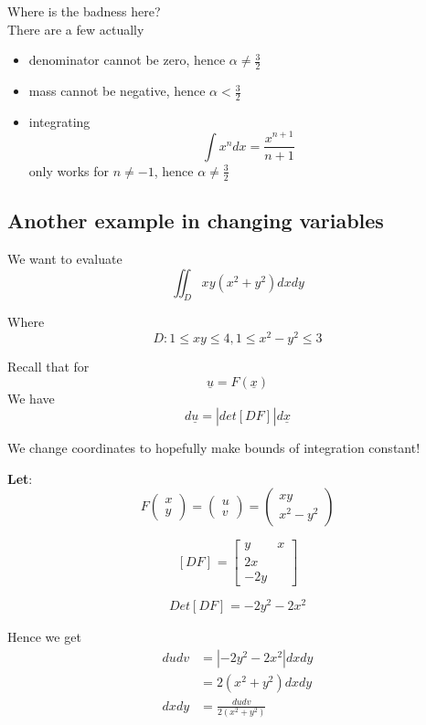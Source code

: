 Where is the badness here? \\

There are a few actually
\begin{itemize}
   \item denominator cannot be zero, hence $ \alpha \neq \frac{3}{2}$ 
   \item mass cannot be negative, hence $\alpha < \frac{ 3}{2}$ 
   \item integrating \[
         \int x^n dx = \frac{x ^{n+1}}{n+1}
   \] only works for $n \neq -1$, hence  $\alpha \neq \frac{3}{2}$
\end{itemize}

\subsection{Another example in changing variables}

We want to evaluate 
\[
   \iint_{D} xy (x^2 + y^2) dx dy
\] 

Where
\[
  D: 1 \leq xy \leq 4, 1 \leq x^2 - y^2  \leq 3
\] 

Recall that for
\[
  \underline{u} = F( \underline{x})
\] 
We have
\[
  d \underline{u} = \left| det \left[ D F \right]_{}  \right| d \underline{x}
\] 

We change coordinates to hopefully make bounds of integration constant!

\textbf{Let}:
\[
  F \begin{pmatrix} x \\y \end{pmatrix}  = \begin{pmatrix} u \\v \end{pmatrix}  = \begin{pmatrix}  xy \\ x^2 - y^2 \end{pmatrix} 
\] 

\[
  \left[ D F \right]_{} = \begin{bmatrix} 
     y & x \\ 2x \\ -2y  
  \end{bmatrix}
\] 

\[
  Det \left[ D F \right]_{}  = - 2y^2 - 2x^2
\] 

Hence we get
\begin{align*}
   dudv &= \left| -2y^2 -2x^2 \right| dxdy  \\
        &= 2 (x^2 + y^2) dx dy \\
   dxdy &= \frac{dudv}{2(x^2+y^2)}
\end{align*}

